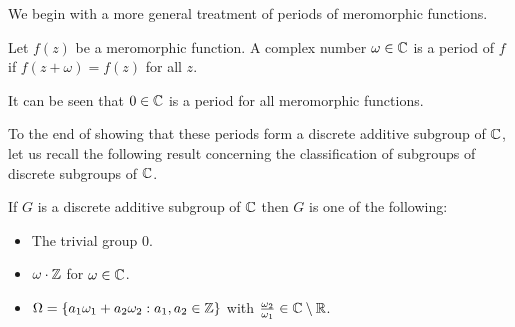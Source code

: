 We begin with a more general treatment of periods of meromorphic functions. 
\begin{definition}[Period]\label{def: period}
    Let $f(z)$ be a meromorphic function. A complex number $\omega\in\mathbb{C}$ is a period of $f$ if $f(z+\omega)=f(z)$ for all $z$. 
\end{definition}
\begin{remark}\label{rmk: zero is a period}
    It can be seen that $0\in\mathbb{C}$ is a period for all meromorphic functions.
\end{remark}
To the end of showing that these periods form a discrete additive subgroup of $\mathbb{C}$, let us recall the following result concerning the classification of subgroups of discrete subgroups of $\mathbb{C}$. 
\begin{lemma}\label{lem: discrete subgroups of complex numbers}
    If $G$ is a discrete additive subgroup of $\mathbb{C}$ then $G$ is one of the following:
    \begin{itemize}
        \item The trivial group 0. 
        \item $\omega\cdot\mathbb{Z}$ for $\omega\in\mathbb{C}$. 
        \item $\Omega=\{a_{1}\omega_{1}+a_{2}\omega_{2}:a_{1},a_{2}\in\mathbb{Z}\}$ with $\frac{\omega_{2}}{\omega_{1}}\in\mathbb{C}\setminus\mathbb{R}$. 
    \end{itemize}
\end{lemma}
